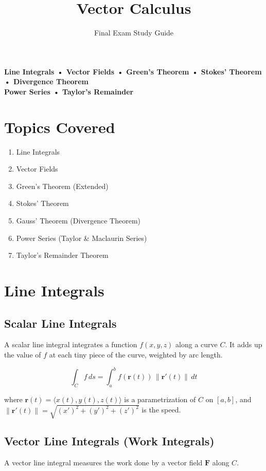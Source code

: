 \documentclass[12pt]{article}
\title{Vector Calculus}
\author{Final Exam Study Guide}
\date{}
\begin{document}
\maketitle

\begin{center}
\large \textbf{Line Integrals • Vector Fields • Green's Theorem • Stokes' Theorem • Divergence Theorem \\ Power Series • Taylor's Remainder}
\end{center}

\tableofcontents
\newpage

\section{Topics Covered}
\begin{enumerate}[label=\arabic*.]
    \item Line Integrals
    \item Vector Fields
    \item Green's Theorem (Extended)
    \item Stokes' Theorem
    \item Gauss' Theorem (Divergence Theorem)
    \item Power Series (Taylor \& Maclaurin Series)
    \item Taylor's Remainder Theorem
\end{enumerate}

\section{Line Integrals}

\subsection{Scalar Line Integrals}
A scalar line integral integrates a function \(f(x,y,z)\) along a curve \(C\). It adds up the value of \(f\) at each tiny piece of the curve, weighted by arc length.

\[
\boxed{\int_C f\,ds = \int_a^b f(\mathbf{r}(t))\,\|\mathbf{r}'(t)\|\,dt}
\]

where \(\mathbf{r}(t)=\langle x(t), y(t), z(t)\rangle\) is a parametrization of \(C\) on \([a,b]\), and \(\|\mathbf{r}'(t)\| = \sqrt{(x')^2+(y')^2+(z')^2}\) is the speed.

\subsection{Vector Line Integrals (Work Integrals)}
A vector line integral measures the work done by a vector field \(\mathbf{F}\) along \(C\).
\end{document}
